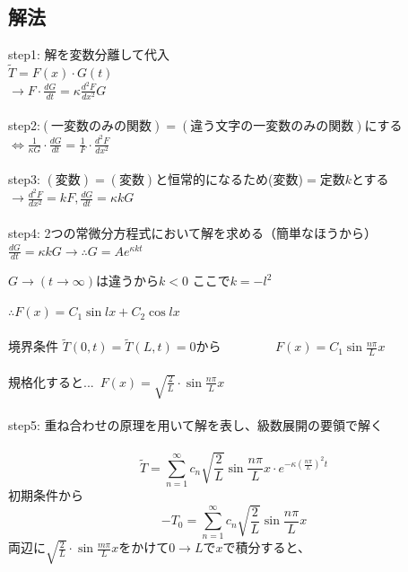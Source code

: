 \documentclass[titlepage,dvipdfmx]{jsarticle}
\begin{document}
\subsection*{解法}
\noindent step1: 解を変数分離して代入\\
$\widetilde{T}= F(x)\cdot G(t)$\\
$\displaystyle \rightarrow F \cdot \frac{d G}{dt}=\kappa \frac{d^2 F}{d x^2}G$\\\\
step2:$(一変数のみの関数)=(違う文字の一変数のみの関数)$にする\\
$\displaystyle \Leftrightarrow \frac{1}{\kappa G}\cdot \frac{d G}{dt}= \frac{1}{F}\cdot \frac{d^2 F}{dx^2}$\\\\
step3: $(変数)=(変数)$と恒常的になるため(変数)$=$定数$k$とする\\
$\displaystyle \rightarrow \frac{d^2 F}{dx^2}=kF , \frac{dG}{dt}=\kappa k G$\\\\
step4: 2つの常微分方程式において解を求める（簡単なほうから）
$\displaystyle \frac{dG}{dt} =\kappa k G \rightarrow \therefore G =Ae^{\kappa k t}$\\
\begin{center}
$G\rightarrow (t\rightarrow \infty)は違うからk<0$ ここで$k=-l^2$
\end{center}
$\therefore F(x)=C_1\sin lx +C_2 \cos lx $ \\\\
境界条件 $\widetilde{T}(0,t)=\widetilde{T}(L,t)=0$から~~~~~~~~
$\displaystyle F(x)=C_1 \sin \frac{n\pi}{L}x$\\\\
規格化すると...~$\displaystyle F(x)=\sqrt{\frac{2}{L}}\cdot \sin \frac{n\pi}{L}x$　\\\\
step5: 重ね合わせの原理を用いて解を表し、級数展開の要領で解く\\\\
\begin{equation}\displaystyle
\widetilde{T}=\sum_{n=1}^{\infty} c_n \sqrt{\frac{2}{L}} \sin \frac{n\pi}{L}x \cdot e^{-\kappa (\frac{n \pi }{L})^2t}
\nonumber
\end{equation}
初期条件から\\
\begin{equation}\displaystyle
-T_0=\sum_{n=1}^{\infty} c_n \sqrt{\frac{2}{L}} \sin \frac{n\pi}{L}x
\nonumber
\end{equation}
両辺に$\displaystyle \sqrt{\frac{2}{L}}\cdot \sin \frac{m\pi}{L}x$をかけて$0\rightarrow L$で$x$で積分すると、\\
\end{document}
